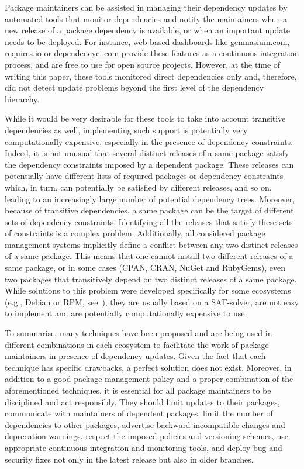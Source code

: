 \documentclass[smallextended]{svjour3}       %
\newcommand{\eg}{e.g.,\xspace}
\newcommand{\cran}{\textsf{CRAN}\xspace}
\newcommand{\cpan}{\textsf{CPAN}\xspace}
\newcommand{\rubygems}{\textsf{RubyGems}\xspace}
\newcommand{\nuget}{\textsf{NuGet}\xspace}
\begin{document}
Package maintainers can be assisted in managing their dependency updates by automated tools that monitor dependencies and notify the maintainers when a new release of a package dependency is available, or when an important update needs to be deployed.
For instance, web-based dashboards like \textsf{\url{gemnasium.com}}, \textsf{\url{requires.io}} or \textsf{\url{dependencyci.com}} provide these features as a continuous integration process, and are free to use for open source projects.
However, at the time of writing this paper, these tools monitored direct dependencies only and, therefore, did not detect update problems beyond the first level of the dependency hierarchy.

While it would be very desirable for these tools to take into account transitive dependencies as well, implementing such support is potentially very computationally expensive, especially in the presence of dependency constraints. 
%
Indeed, it is not unusual that several distinct releases of a same package satisfy the dependency constraints imposed by a dependent package. These releases can potentially have different lists of required packages or dependency constraints which, in turn, can potentially be satisfied by different releases, and so on, leading to an increasingly large number of potential dependency trees.
Moreover, because of transitive dependencies, a same package can be the target of different sets of dependency constraints. 
Identifying all the releases that satisfy these sets of constraints is a complex problem. 
Additionally, all considered package management systems implicitly define a conflict between any two distinct releases of a same package. This means that one cannot install two different releases of a same package, or in some cases (\cpan, \cran, \nuget and \rubygems), even two packages that transitively depend on two distinct releases of a same package.
%
While solutions to this problem were developed specifically for some ecosystems (\eg Debian or RPM, see~\cite{DiCosmo:2011:SCC:2025113.2025149,vouillon2013broken}), they are usually based on a SAT-solver, are not easy to implement and are potentially computationally expensive to use. 

To summarise, many techniques have been proposed and are being used in different combinations in each ecosystem to facilitate the work of package maintainers in presence of dependency updates.
Given the fact that each technique has specific drawbacks, a perfect solution does not exist.
Moreover, in addition to a good package management policy and a proper combination of the aforementioned techniques, it is essential for all package maintainers to be disciplined and act responsibly. They should limit updates to their packages, communicate with maintainers of dependent packages, limit the number of dependencies to other packages, advertise backward incompatible changes and deprecation warnings, respect the imposed policies and versioning schemes, use appropriate continuous integration and monitoring tools, and deploy bug and security fixes not only in the latest release but also in older branches.
\end{document}
